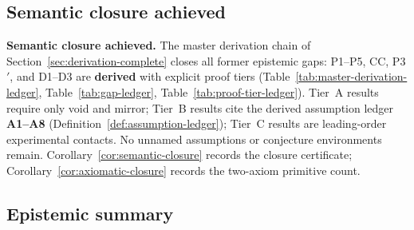 \subsection{Semantic closure achieved}

\textbf{Semantic closure achieved.} The master derivation chain of
Section~\ref{sec:derivation-complete} closes all former epistemic gaps:
P1--P5, CC, P3$'$, and D1--D3 are \textbf{derived} with explicit proof tiers
(Table~\ref{tab:master-derivation-ledger},
Table~\ref{tab:gap-ledger}, Table~\ref{tab:proof-tier-ledger}).
Tier~A results require only void and mirror; Tier~B results cite the derived
assumption ledger \textbf{A1--A8} (Definition~\ref{def:assumption-ledger});
Tier~C results are leading-order experimental contacts. No unnamed assumptions
or conjecture environments remain. Corollary~\ref{cor:semantic-closure} records
the closure certificate; Corollary~\ref{cor:axiomatic-closure} records the
two-axiom primitive count.

\subsection{Epistemic summary}

